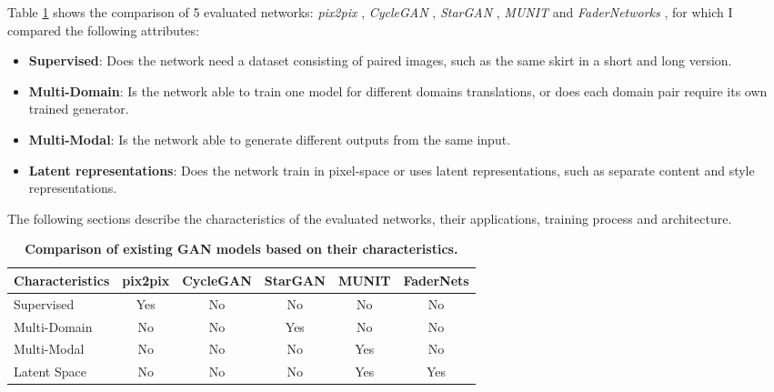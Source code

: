 \documentclass{article}
\begin{document}
Table \ref{tab:gan_comp} shows the comparison of 5 evaluated networks: \textit{pix2pix} \cite{isola_image--image_2016}, \textit{CycleGAN} \cite{zhu_unpaired_2017}, \textit{StarGAN} \cite{choi_stargan_2017}, \textit{MUNIT} \cite{huang_multimodal_2018} and \textit{FaderNetworks} \cite{lample_fader_2017}, for which I compared the following attributes:
\begin{itemize}
\item \textbf{Supervised}: Does the network need a dataset consisting of paired images, such as the same skirt in a short and long version.
\item \textbf{Multi-Domain}: Is the network able to train one model for different domains translations, or does each domain pair require its own trained generator.
\item \textbf{Multi-Modal}: Is the network able to generate different outputs from the same input.
\item \textbf{Latent representations}: Does the network train in pixel-space or uses latent representations, such as separate content and style representations.
\end{itemize}

The following sections describe the characteristics of the evaluated networks, their applications, training process and architecture.

\begin{table}[t]
\centering
\begin{tabular}{l*{5}{c}}
Characteristics & pix2pix &	CycleGAN & StarGAN	& MUNIT	& FaderNets \\
\hline
Supervised				& Yes & No & No & No & No \\
Multi-Domain  			& No  & No & Yes & No & No \\
Multi-Modal				& No & No & No & Yes & No \\
Latent Space 			& No & No & No & Yes & Yes \\
\end{tabular}
\caption{\label{tab:gan_comp}\textbf{Comparison of existing GAN models based on their characteristics.} %
}
\end{table}
\end{document}
